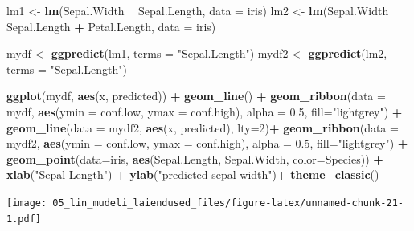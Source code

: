 \documentclass[]{book}
\newenvironment{Shaded}{\begin{snugshade}}{\end{snugshade}}
\newcommand{\KeywordTok}[1]{\textcolor[rgb]{0.13,0.29,0.53}{\textbf{#1}}}
\newcommand{\DataTypeTok}[1]{\textcolor[rgb]{0.13,0.29,0.53}{#1}}
\newcommand{\DecValTok}[1]{\textcolor[rgb]{0.00,0.00,0.81}{#1}}
\newcommand{\FloatTok}[1]{\textcolor[rgb]{0.00,0.00,0.81}{#1}}
\newcommand{\StringTok}[1]{\textcolor[rgb]{0.31,0.60,0.02}{#1}}
\newcommand{\OperatorTok}[1]{\textcolor[rgb]{0.81,0.36,0.00}{\textbf{#1}}}
\newcommand{\NormalTok}[1]{#1}
\begin{document}
\begin{Shaded}
\begin{Highlighting}[]
\NormalTok{lm1 <-}\StringTok{ }\KeywordTok{lm}\NormalTok{(Sepal.Width }\OperatorTok{~}\StringTok{ }\NormalTok{Sepal.Length, }\DataTypeTok{data =}\NormalTok{ iris)}
\NormalTok{lm2 <-}\StringTok{ }\KeywordTok{lm}\NormalTok{(Sepal.Width }\OperatorTok{~}\StringTok{ }\NormalTok{Sepal.Length }\OperatorTok{+}\StringTok{ }\NormalTok{Petal.Length, }\DataTypeTok{data =}\NormalTok{ iris)}

\NormalTok{mydf <-}\StringTok{ }\KeywordTok{ggpredict}\NormalTok{(lm1, }\DataTypeTok{terms =} \StringTok{"Sepal.Length"}\NormalTok{)}
\NormalTok{mydf2 <-}\StringTok{ }\KeywordTok{ggpredict}\NormalTok{(lm2, }\DataTypeTok{terms =} \StringTok{"Sepal.Length"}\NormalTok{)}

\KeywordTok{ggplot}\NormalTok{(mydf, }\KeywordTok{aes}\NormalTok{(x, predicted)) }\OperatorTok{+}\StringTok{ }
\StringTok{  }\KeywordTok{geom_line}\NormalTok{() }\OperatorTok{+}
\StringTok{  }\KeywordTok{geom_ribbon}\NormalTok{(}\DataTypeTok{data =}\NormalTok{ mydf, }\KeywordTok{aes}\NormalTok{(}\DataTypeTok{ymin =}\NormalTok{ conf.low, }\DataTypeTok{ymax =}\NormalTok{ conf.high), }
              \DataTypeTok{alpha =} \FloatTok{0.5}\NormalTok{, }\DataTypeTok{fill=}\StringTok{"lightgrey"}\NormalTok{) }\OperatorTok{+}
\StringTok{  }\KeywordTok{geom_line}\NormalTok{(}\DataTypeTok{data =}\NormalTok{ mydf2, }\KeywordTok{aes}\NormalTok{(x, predicted), }\DataTypeTok{lty=}\DecValTok{2}\NormalTok{)}\OperatorTok{+}
\StringTok{  }\KeywordTok{geom_ribbon}\NormalTok{(}\DataTypeTok{data =}\NormalTok{ mydf2, }\KeywordTok{aes}\NormalTok{(}\DataTypeTok{ymin =}\NormalTok{ conf.low, }\DataTypeTok{ymax =}\NormalTok{ conf.high), }
              \DataTypeTok{alpha =} \FloatTok{0.5}\NormalTok{, }\DataTypeTok{fill=}\StringTok{"lightgrey"}\NormalTok{) }\OperatorTok{+}
\StringTok{  }\KeywordTok{geom_point}\NormalTok{(}\DataTypeTok{data=}\NormalTok{iris, }\KeywordTok{aes}\NormalTok{(Sepal.Length, Sepal.Width, }\DataTypeTok{color=}\NormalTok{Species)) }\OperatorTok{+}\StringTok{ }
\StringTok{  }\KeywordTok{xlab}\NormalTok{(}\StringTok{"Sepal Length"}\NormalTok{) }\OperatorTok{+}\StringTok{ }
\StringTok{  }\KeywordTok{ylab}\NormalTok{(}\StringTok{"predicted sepal width"}\NormalTok{)}\OperatorTok{+}
\StringTok{  }\KeywordTok{theme_classic}\NormalTok{()}
\end{Highlighting}
\end{Shaded}

\texttt{[image: 05\_lin\_mudeli\_laiendused\_files/figure-latex/unnamed-chunk-21-1.pdf]}
\end{document}
